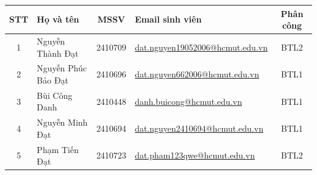 \clearpage
\thispagestyle{empty}

\begin{center}
\renewcommand{\arraystretch}{1.3}
\begin{tabular}{|c|l|c|l|c|}
\hline
\textbf{STT} & \textbf{Họ và tên} & \textbf{MSSV} & \textbf{Email sinh viên} & \textbf{Phân công} \\
\hline
1 & Nguyễn Thành Đạt & 2410709 & \url{dat.nguyen19052006@hcmut.edu.vn} & BTL2 \\
\hline
2 & Nguyễn Phúc Bảo Đạt & 2410696 & \url{dat.nguyen662006@hcmut.edu.vn} & BTL1 \\
\hline
3 & Bùi Công Danh & 2410448 & \url{danh.buicong@hcmut.edu.vn} & BTL1 \\
\hline
4 & Nguyễn Minh Đạt & 2410694 & \url{dat.nguyen2410694@hcmut.edu.vn} & BTL1 \\
\hline
5 & Phạm Tiến Đạt & 2410723 & \url{dat.pham123qwe@hcmut.edu.vn} & BTL2 \\
\hline
\end{tabular}
\end{center}

\vfill
\clearpage
{}
